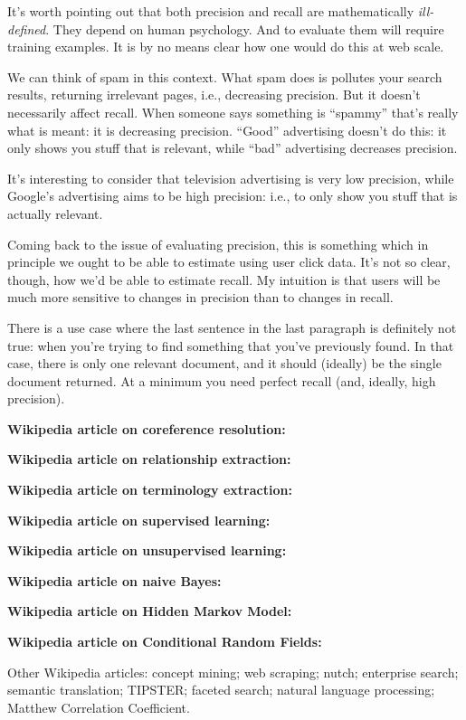 It's worth pointing out that both precision and recall are
mathematically \emph{ill-defined}.  They depend on human psychology.
And to evaluate them will require training examples.  It is by no
means clear how one would do this at web scale.

We can think of spam in this context.  What spam does is pollutes your
search results, returning irrelevant pages, i.e., decreasing
precision.  But it doesn't necessarily affect recall.  When someone
says something is ``spammy'' that's really what is meant: it is
decreasing precision.  ``Good'' advertising doesn't do this: it only
shows you stuff that is relevant, while ``bad'' advertising decreases
precision.

It's interesting to consider that television advertising is very low
precision, while Google's advertising aims to be high precision: i.e.,
to only show you stuff that is actually relevant.

Coming back to the issue of evaluating precision, this is something
which in principle we ought to be able to estimate using user click
data.  It's not so clear, though, how we'd be able to estimate recall.
My intuition is that users will be much more sensitive to changes in
precision than to changes in recall.  

There is a use case where the last sentence in the last paragraph is
definitely not true: when you're trying to find something that you've
previously found.  In that case, there is only one relevant document,
and it should (ideally) be the single document returned.  At a minimum
you need perfect recall (and, ideally, high precision).


\textbf{Wikipedia article on coreference resolution:}

\textbf{Wikipedia article on relationship extraction:}

\textbf{Wikipedia article on terminology extraction:}

\textbf{Wikipedia article on supervised learning:}

\textbf{Wikipedia article on unsupervised learning:}

\textbf{Wikipedia article on naive Bayes:}

\textbf{Wikipedia article on Hidden Markov Model:}

\textbf{Wikipedia article on Conditional Random Fields:}

Other Wikipedia articles: concept mining; web scraping; nutch;
enterprise search; semantic translation; TIPSTER; faceted search;
natural language processing; Matthew Correlation Coefficient.

